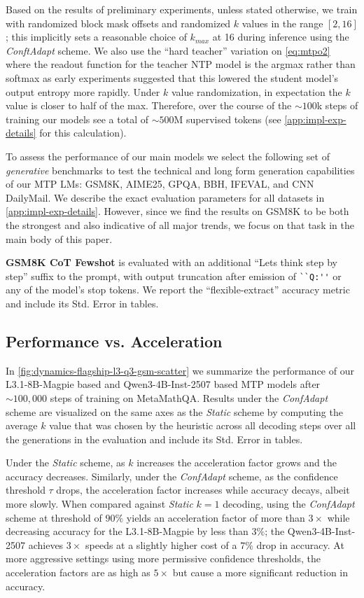 \documentclass{article}
\theoremstyle{plain}
\theoremstyle{definition}
\theoremstyle{remark}
\begin{document}
Based on the results of preliminary experiments, unless stated otherwise, we train with randomized block mask offsets and randomized $k$ values in the range $[2,16]$; this implicitly sets a reasonable choice of $k_{max}$ at 16 during inference using the \textit{ConftAdapt} scheme. We also use the ``hard teacher'' variation on \cref{eq:mtpo2} where the readout function for the teacher NTP model is the argmax rather than softmax as early experiments suggested that this lowered the student model's output entropy more rapidly. Under $k$ value randomization, in expectation the $k$ value is closer to half of the max. Therefore, over the course of the $\sim 100$k steps of training our models see a total of $\sim500$M supervised tokens (see \cref{app:impl-exp-details} for this calculation).

To assess the performance of our main models we select the following set of \textit{generative} benchmarks to test the technical and long form generation capabilities of our MTP LMs: GSM8K, AIME25, GPQA, BBH, IFEVAL, and CNN DailyMail. We describe the exact evaluation parameters for all datasets in \cref{app:impl-exp-details}. 
However, since we find the results on GSM8K to be both the strongest and also indicative of all major trends, we focus on that task in the main body of this paper.

\textbf{GSM8K CoT Fewshot} is evaluated with an additional ``Lets think step by step'' suffix to the prompt, with output truncation after emission of \verb|``Q:''| or any of the model's stop tokens. We report the ``flexible-extract'' accuracy metric and include its Std. Error in tables.

\subsection{Performance vs. Acceleration}\label{sec:exps-perf-models}

In \cref{fig:dynamics-flagship-l3-q3-gsm-scatter} we summarize the performance of our L3.1-8B-Magpie based and Qwen3-4B-Inst-2507 based MTP models after $\sim 100,000$ steps of training on MetaMathQA. Results under the \textit{ConfAdapt} scheme are visualized on the same axes as the \textit{Static} scheme by computing the average $k$ value that was chosen by the heuristic across all decoding steps over all the generations in the evaluation and include its Std. Error in tables. 

Under the \textit{Static} scheme, as $k$ increases the acceleration factor grows and the accuracy decreases. Similarly, under the \textit{ConfAdapt} scheme, as the confidence threshold $\tau$ drops, the acceleration factor increases while accuracy decays, albeit more slowly. When compared against \textit{Static} $k=1$ decoding, using the \textit{ConfAdapt} scheme at threshold of $90\%$ yields an acceleration factor of more than $3\times$ while decreasing accuracy for the L3.1-8B-Magpie by less than $3\%$; the Qwen3-4B-Inst-2507 achieves $3\times$ speeds at a slightly higher cost of a $7\%$ drop in accuracy. At more aggressive settings using more permissive confidence thresholds, the acceleration factors are as high as $5\times$ but cause a more significant reduction in accuracy.
\end{document}
